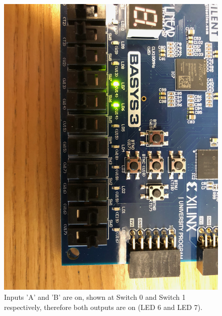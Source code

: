 \documentclass[11pt]{article}
\begin{document}
\begin{figure}[H]
	\includegraphics[width=\textwidth]{report_images/Lab1BoardPictures/Lab1Part1/IMG_0406.jpg}
	\caption{\label{fig:figure-name}Inputs 'A' and 'B' are on, shown at Switch 0 and Switch 1 respectively, therefore both outputs are on (LED 6 and LED 7).}
\end{figure}
\end{document}
